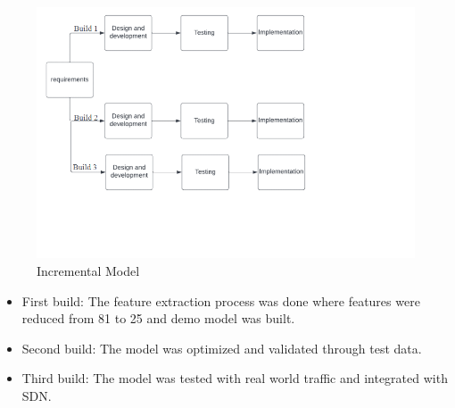 \begin{figure}[tbh] %
	\begin{center}
		\includegraphics[width=6in]{images/sdlc1.png} 
		\caption{Incremental Model} %
		\label{Incremental Model} %
	\end{center}
\end{figure}
\newpage
\begin{itemize}
	\item First build: The feature extraction process was done where features were reduced from 81 to 25 and demo model was built.
	\item Second build: The model was optimized and validated through test data.
	\item Third build: The model was tested with real world traffic and integrated with SDN.
\end{itemize}
